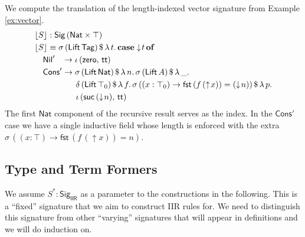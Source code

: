 \documentclass[acmsmall,screen,review,anonymous]{acmart}
\newcommand{\msf}[1]{{\mathsf{#1}}}
\newcommand{\mbf}[1]{{\mathbf{#1}}}
\newcommand{\Nat}{\msf{Nat}}
\newcommand{\zero}{\msf{zero}}
\newcommand{\suc}{\msf{suc}}
\newcommand{\Nil}{\msf{Nil}}
\newcommand{\Cons}{\msf{Cons}}
\newcommand{\Lift}{\msf{Lift}}
\newcommand{\lup}{\uparrow}
\newcommand{\ldown}{\downarrow}
\newcommand{\Sig}{\msf{Sig}}
\newcommand{\Tag}{\msf{Tag}}
\newcommand{\case}{\mbf{case}}
\newcommand{\of}{\mbf{of}}
\newcommand{\ttt}{\msf{tt}}
\newcommand{\fst}{\msf{fst}}
\newcommand{\IIR}{\msf{IIR}}
\newcommand{\floord}[1]{\lfloor #1 \rfloor}
\begin{document}
\begin{example} We compute the translation of the length-indexed vector signature from Example \ref{ex:vector}.
\begin{alignat*}{4}
  & \floord{S} : \Sig\,(\Nat \times \top)\\
  & \floord{S} \equiv \sigma\,(\Lift\,\Tag)\,\$\,\lambda\,t.\,\case \ldown\!t\,\of \\
  & \quad \Nil'\hspace{0.85em} \to \iota\,(\zero,\,\ttt) \\
  & \quad \Cons'\to \sigma\,(\Lift\,\Nat)\,\$\,\lambda\,n.\,\sigma\,(\Lift\,A)\,\$\,\lambda\,\_.\\
  & \quad \hspace{4em}  \delta\,(\Lift\,\top_0)\,\$\,\lambda\,f.\,\sigma\,((x : \top_0) \to \fst\,(f\,(\lup\!x)) = (\ldown\!n))\,\$\,\lambda\,p.\\
  & \quad \hspace{4em}  \iota\,(\suc\,(\ldown\!n),\,\ttt)
\end{alignat*}
The first $\Nat$ component of the recursive result serves as the index. In the $\Cons'$ case we
have a single inductive field whose length is enforced with the extra $\sigma\,((x : \top) \to
\fst\,(f\,(\lup\!x)) = n)$.

\end{example}

\subsection{Type and Term Formers}\label{sec:iir-construction-type-term}
We assume $S^* : \Sig_\IIR$ as a parameter to the constructions in the following. This is a
``fixed'' signature that we aim to construct IIR rules for. We need to distinguish this signature from
other ``varying'' signatures that will appear in definitions and we will do induction on.
\end{document}
